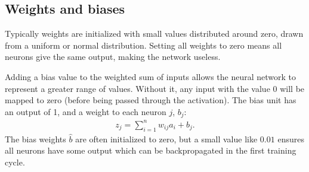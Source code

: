 \documentclass[letterpaper,10pt,english]{sphinxmanual}
\begin{document}
\subsection{Weights and biases}
\label{\detokenize{chapter6:weights-and-biases}}
Typically weights are initialized with small values distributed around zero, drawn from a uniform
or normal distribution. Setting all weights to zero means all neurons give the same output, making the network useless.

Adding a bias value to the weighted sum of inputs allows the neural network to represent a greater range
of values. Without it, any input with the value 0 will be mapped to zero (before being passed through the activation). The bias unit has an output of 1, and a weight to each neuron \(j\), \(b_j\):
\begin{equation*}
\begin{split} z_j = \sum_{i=1}^n w_ {ij} a_i + b_j.\end{split}
\end{equation*}
The bias weights \(\hat{b}\) are often initialized to zero, but a small value like \(0.01\) ensures all neurons have some output which can be backpropagated in the first training cycle.

\begin{sphinxVerbatim}[commandchars=\\\{\}]

   
  
  


   
    

   
    
\end{sphinxVerbatim}
\end{document}
